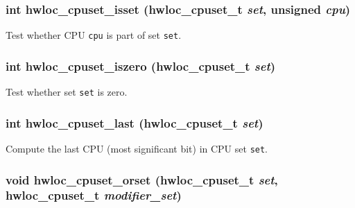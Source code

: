 \hypertarget{group__hwlocality__cpuset_g70f87ccdc6f295206f2d0df32aa62348}{
\subsubsection[{hwloc\_\-cpuset\_\-isset}]{\setlength{\rightskip}{0pt plus 5cm}int hwloc\_\-cpuset\_\-isset ({\bf hwloc\_\-cpuset\_\-t} {\em set}, \/  unsigned {\em cpu})}}
\label{group__hwlocality__cpuset_g70f87ccdc6f295206f2d0df32aa62348}


Test whether CPU {\tt cpu} is part of set {\tt set}. 

\hypertarget{group__hwlocality__cpuset_g38796861f5b8282d7f2b3acef36bc309}{
\subsubsection[{hwloc\_\-cpuset\_\-iszero}]{\setlength{\rightskip}{0pt plus 5cm}int hwloc\_\-cpuset\_\-iszero ({\bf hwloc\_\-cpuset\_\-t} {\em set})}}
\label{group__hwlocality__cpuset_g38796861f5b8282d7f2b3acef36bc309}


Test whether set {\tt set} is zero. 

\hypertarget{group__hwlocality__cpuset_g713e886fb6364e6440e911e1c58a7b62}{
\subsubsection[{hwloc\_\-cpuset\_\-last}]{\setlength{\rightskip}{0pt plus 5cm}int hwloc\_\-cpuset\_\-last ({\bf hwloc\_\-cpuset\_\-t} {\em set})}}
\label{group__hwlocality__cpuset_g713e886fb6364e6440e911e1c58a7b62}


Compute the last CPU (most significant bit) in CPU set {\tt set}. 

\hypertarget{group__hwlocality__cpuset_ga8fe567ba2d77e55d08823c121d19b93}{
\subsubsection[{hwloc\_\-cpuset\_\-orset}]{\setlength{\rightskip}{0pt plus 5cm}void hwloc\_\-cpuset\_\-orset ({\bf hwloc\_\-cpuset\_\-t} {\em set}, \/  {\bf hwloc\_\-cpuset\_\-t} {\em modifier\_\-set})}}
\label{group__hwlocality__cpuset_ga8fe567ba2d77e55d08823c121d19b93}



